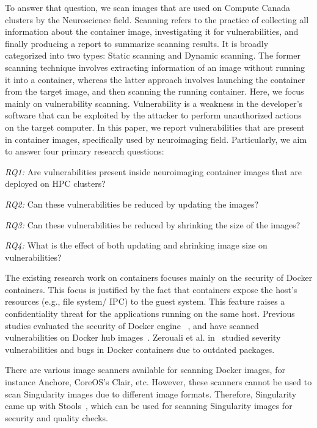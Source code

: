 \documentclass[a4paper,num-refs]{oup-contemporary}
\begin{document}
To answer that question, we scan images that are used on Compute
Canada clusters by the Neuroscience field. Scanning refers to the practice of
collecting all information about the container image, investigating it
for vulnerabilities, and finally producing a
report to summarize scanning results. It is broadly categorized into
two types: Static scanning and Dynamic scanning. The former scanning technique
involves extracting information of an image without running it into a container,
whereas the latter approach involves launching the container from the target image, and
then scanning the running container.
Here, we focus mainly on vulnerability scanning.
Vulnerability is a weakness in the developer's software that can be exploited
by the attacker to perform unauthorized actions on the target computer.
In this paper, we report vulnerabilities that are present in
container images, specifically used by neuroimaging field. Particularly,
we aim to answer four primary research questions:

\textit{RQ1:} Are vulnerabilities present inside neuroimaging container images that are
deployed on HPC clusters?

\textit{RQ2:} Can these vulnerabilities be reduced by updating the images?

\textit{RQ3:} Can these vulnerabilities be reduced by shrinking the size of the images?

\textit{RQ4:} What is the effect of both updating
and shrinking image size on vulnerabilities?

The existing research work on containers focuses mainly on the security of Docker
containers.
This focus is justified by the fact that containers expose the host's resources
(e.g., file system/ IPC) to the guest system. This feature raises a confidentiality
threat for the applications running on the same host. Previous studies evaluated
the security of Docker engine ~\cite{martin2018docker, sultan2019container, combe2016docker, bui2015analysis},
and have scanned vulnerabilities on Docker hub images~\cite{Shu2017, gummaraju2015over}.
Zerouali et al. in~\cite{zerouali2019relation} studied severity vulnerabilities and bugs in Docker 
containers due to outdated packages. 

There are various image scanners available for scanning Docker images, for
instance Anchore, CoreOS's Clair, etc.
However, these scanners cannot be used to scan Singularity images due to different image formats.
Therefore, Singularity came up with Stools~\cite{stools}, which can be used for scanning Singularity images
for security and quality checks.
\end{document}
